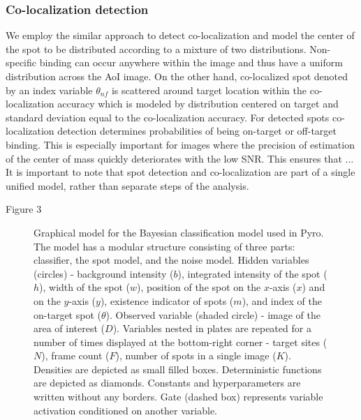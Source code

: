 \subsubsection{Co-localization detection}

We employ the similar approach to detect co-localization and model the center of the spot to be distributed according to a mixture of two distributions. Non-specific binding can occur anywhere within the image and thus have a uniform distribution across the AoI image. On the other hand, co-localized spot denoted by an index variable $\theta_{nf}$ is scattered around target location within the co-localization accuracy which is modeled by distribution centered on target and standard deviation equal to the co-localization accuracy. For detected spots co-localization detection determines probabilities of being on-target or off-target binding. This is especially important for images where the precision of estimation of the center of mass quickly deteriorates with the low SNR. This ensures that ... It is important to note that spot detection and co-localization are part of a single unified model, rather than separate steps of the analysis.

Figure 3

\begin{figure}[ht]
  \begin{center}
    
  \end{center}
  \caption{Graphical model for the Bayesian classification model used in Pyro. The model has a modular structure consisting of three parts: classifier, the spot model, and the noise model. Hidden variables (circles) - background intensity ($b$), integrated intensity of the spot ($h$), width of the spot ($w$), position of the spot on the $x$-axis ($x$) and on the $y$-axis ($y$), existence indicator of spots ($m$), and index of the on-target spot ($\theta$). Observed variable (shaded circle) - image of the area of interest ($D$). Variables nested in plates are repeated for a number of times displayed at the bottom-right corner - target sites ($N$), frame count ($F$), number of spots in a single image ($K$). Densities are depicted as  small filled boxes. Deterministic functions are depicted as diamonds. Constants and hyperparameters are written without any borders. Gate (dashed box) represents variable activation conditioned on another variable.}
  \label{fig:graph}
\end{figure}

